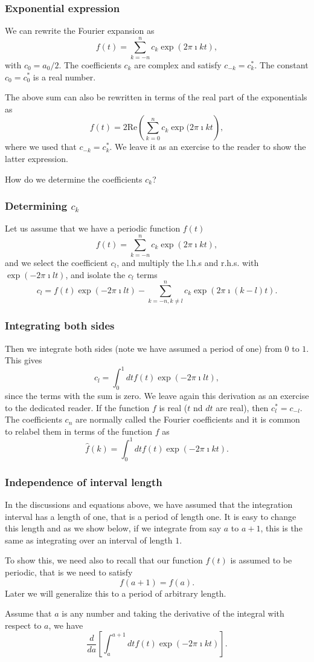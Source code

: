 \documentclass{beamer}
\begin{document}
\begin{frame}
\frametitle{Exponential expression}

We can rewrite the Fourier expansion as
\[
f(t) =\sum_{k=-n}^{n}c_{k}\exp{(2\pi\imath kt)}, 
\]
with $c_0=a_0/2$. The coefficients $c_k$ are complex and satisfy $c_{-k}=c_k^*$.
The constant $c_{0}=c_0^*$ is a real number.

The above sum can also be rewritten in terms of the real part of the exponentials as
\[
f(t) =2\mathrm{Re}\left(\sum_{k=0}^{n}c_{k}\exp{(2\pi\imath kt} \right),
\]
where we used that $c_{-k}=c_k^*$. We leave it as an exercise to the reader to show the latter expression.

How do we determine the coefficients $c_k$?
\end{frame}

\begin{frame}
\frametitle{Determining $c_k$}

Let us assume that we have a periodic function $f(t)$ 
\[
f(t) =\sum_{k=-n}^{n}c_{k}\exp{(2\pi\imath kt)}, 
\]
and we select the coefficient $c_l$, and multiply the l.h.s and r.h.s. with $\exp{(-2\pi\imath lt)}$, and isolate the $c_l$ terms
\[
c_l=f(t)\exp{(-2\pi\imath lt)}-\sum_{k=-n, k\ne l}^{n}c_{k}\exp{(2\pi\imath (k-l)t)}. 
\]
\end{frame}

\begin{frame}
\frametitle{Integrating both sides}

Then we integrate both sides (note we have assumed a period of one) from $0$ to $1$. This gives
\[
c_l=\int_0^1 dtf(t)\exp{(-2\pi\imath lt)},
\]
since the terms with the sum is zero.  We leave again this derivation as an exercise to the dedicated reader.
If the function $f$ is real ($t$ nd $dt$ are real), then $c_l^*=c_{-l}$.
The coefficients $c_n$ are normally called the Fourier coefficients and it is common to relabel them in terms of the function $f$ as
\[
\hat{f}(k)=\int_0^1 dt f(t)\exp{(-2\pi\imath kt)}.
\]
\end{frame}

\begin{frame}
\frametitle{Independence of interval length}

In the discussions and equations above, we have assumed that the
integration interval has a length of one, that is a period of length one. It is easy to change this
length and as we show below, if we integrate from say $a$ to $a+1$, this is the same as integrating over an interval of length $1$.

To show this, we need also to recall that our function $f(t)$ is assumed to be periodic, that is we need to satisfy
\[
f(a+1)=f(a).
\]
Later we will generalize this to a period of arbitrary length.

Assume that $a$ is any number and taking the derivative of the integral with respect to $a$, we have
\[
\frac{d}{da}\left[\int_a^{a+1} dt f(t)\exp{(-2\pi\imath kt)}\right]. 
\]
\end{frame}
\end{document}
